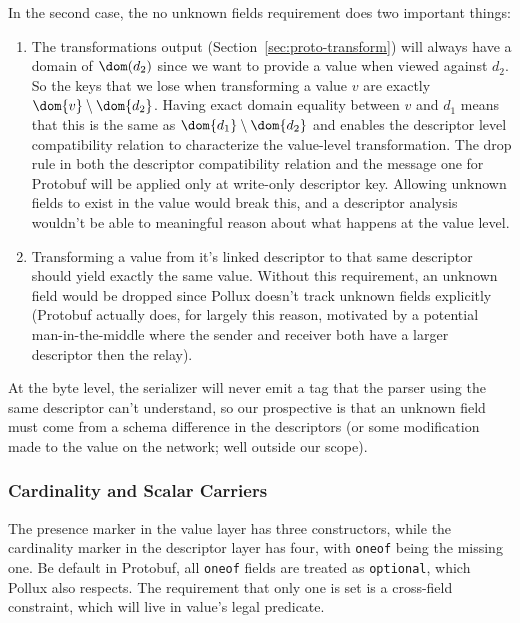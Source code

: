 In the second case, the no unknown fields requirement does two important
things:

\begin{enumerate}
\item The transformations output (Section~\ref{sec:proto-transform}) will always
  have a domain of $\dom(d_2)$ since we want to provide a value when viewed
  against $d_2$. So the keys that we lose when transforming a value $v$ are
  exactly $\dom{v} \setminus \dom{d_2}$. Having exact domain equality between
  $v$ and $d_1$ means that this is the same as $\dom{d_1} \setminus \dom{d_2}$
  and enables the descriptor level compatibility relation to characterize the
  value-level transformation. The drop rule in both the descriptor compatibility
  relation and the message one for Protobuf will be applied only at write-only
  descriptor key. Allowing unknown fields to exist in the value would break
  this, and a descriptor analysis wouldn't be able to meaningful reason about
  what happens at the value level.
\item Transforming a value from it's linked descriptor to that same descriptor
  should yield exactly the same value. Without this requirement, an unknown field
  would be dropped since Pollux doesn't track unknown fields explicitly
  (Protobuf actually does, for largely this reason, motivated by a potential
  man-in-the-middle where the sender and receiver both have a larger descriptor
  then the relay).
\end{enumerate}

At the byte level, the serializer will never emit a tag that the parser using
the same descriptor can't understand, so our prospective is that an unknown
field must come from a schema difference in the descriptors (or some
modification made to the value on the network; well outside our scope).

\subsubsection{Cardinality and Scalar Carriers}

The presence marker in the value layer has three constructors, while the
cardinality marker in the descriptor layer has four, with \texttt{oneof} being
the missing one. Be default in Protobuf, all \texttt{oneof} fields are treated
as \texttt{optional}, which Pollux also respects. The requirement that only one
is set is a cross-field constraint, which will live in value's legal predicate.

